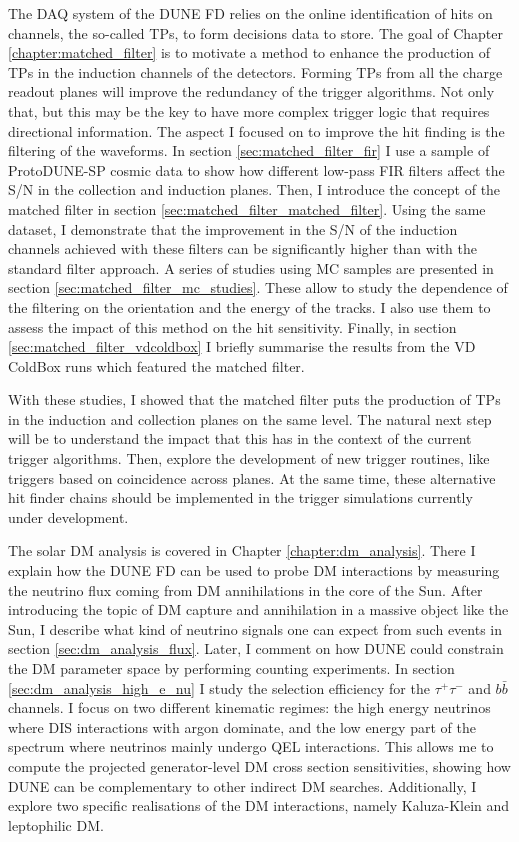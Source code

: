 The DAQ system of the DUNE FD relies on the online identification of hits on channels, the so-called TPs, to form decisions data to store. The goal of Chapter \ref{chapter:matched_filter} is to motivate a method to enhance the production of TPs in the induction channels of the detectors. Forming TPs from all the charge readout planes will improve the redundancy of the trigger algorithms. Not only that, but this may be the key to have more complex trigger logic that requires directional information. The aspect I focused on to improve the hit finding is the filtering of the waveforms. In section \ref{sec:matched_filter_fir} I use a sample of ProtoDUNE-SP cosmic data to show how different low-pass FIR filters affect the S/N in the collection and induction planes. Then, I introduce the concept of the matched filter in section \ref{sec:matched_filter_matched_filter}. Using the same dataset, I demonstrate that the improvement in the S/N of the induction channels achieved with these filters can be significantly higher than with the standard filter approach. A series of studies using MC samples are presented in section \ref{sec:matched_filter_mc_studies}. These allow to study the dependence of the filtering on the orientation and the energy of the tracks. I also use them to assess the impact of this method on the hit sensitivity. Finally, in section \ref{sec:matched_filter_vdcoldbox} I briefly summarise the results from the VD ColdBox runs which featured the matched filter.

With these studies, I showed that the matched filter puts the production of TPs in the induction and collection planes on the same level. The natural next step will be to understand the impact that this has in the context of the current trigger algorithms. Then, explore the development of new trigger routines, like triggers based on coincidence across planes. At the same time, these alternative hit finder chains should be implemented in the trigger simulations currently under development.

The solar DM analysis is covered in Chapter \ref{chapter:dm_analysis}. There I explain how the DUNE FD can be used to probe DM interactions by measuring the neutrino flux coming from DM annihilations in the core of the Sun. After introducing the topic of DM capture and annihilation in a massive object like the Sun, I describe what kind of neutrino signals one can expect from such events in section \ref{sec:dm_analysis_flux}. Later, I comment on how DUNE could constrain the DM parameter space by performing counting experiments. In section \ref{sec:dm_analysis_high_e_nu} I study the selection efficiency for the $\tau^{+}\tau^{-}$ and $b\bar{b}$ channels. I focus on two different kinematic regimes: the high energy neutrinos where DIS interactions with argon dominate, and the low energy part of the spectrum where neutrinos mainly undergo QEL interactions. This allows me to compute the projected generator-level DM cross section sensitivities, showing how DUNE can be complementary to other indirect DM searches. Additionally, I explore two specific realisations of the DM interactions, namely Kaluza-Klein and leptophilic DM.

